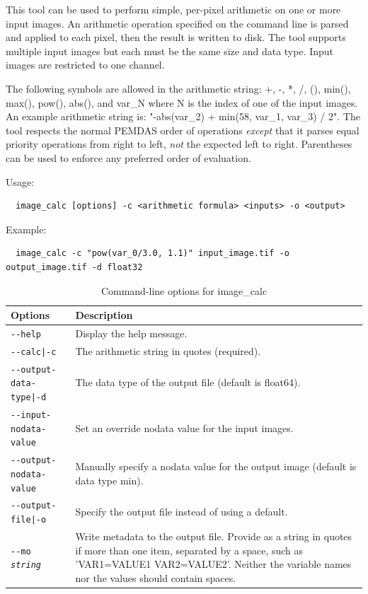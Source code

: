 This tool can be used to perform simple, per-pixel arithmetic on one or more
input images. An arithmetic operation specified on the command line is parsed
and applied to each pixel, then the result is written to disk. The tool
supports multiple input images but each must be the same size and data type.
Input images are restricted to one channel.

The following symbols are allowed in the arithmetic string: +, -, *, /,
(), min(), max(), pow(), abs(), and var\_N where N is the index of one
of the input images. An example arithmetic string is: "-abs(var\_2) +
min(58, var\_1, var\_3) / 2".  The tool respects the normal PEMDAS order
of operations \textit{except} that it parses equal priority operations
from right to left, \textit{not} the expected left to right.
Parentheses can be used to enforce any preferred order of evaluation.


\medskip

Usage:
\begin{verbatim}
  image_calc [options] -c <arithmetic formula> <inputs> -o <output>
\end{verbatim}

Example:
\begin{verbatim}
  image_calc -c "pow(var_0/3.0, 1.1)" input_image.tif -o output_image.tif -d float32
\end{verbatim}

\medskip

\begin{longtable}{|l|p{10cm}|}
\caption{Command-line options for image\_calc}
\label{tbl:imagecalc}
\endfirsthead
\endhead
\endfoot
\endlastfoot
\hline
Options & Description \\ \hline \hline
\texttt{-\/-help} & Display the help message.\\ \hline
\texttt{-\/-calc|-c} & The arithmetic string in quotes (required).\\ \hline
\texttt{-\/-output-data-type|-d} & The data type of the output file (default is float64).\\ \hline
\texttt{-\/-input-nodata-value} & Set an override nodata value for the input images.\\ \hline
\texttt{-\/-output-nodata-value} & Manually specify a nodata value for the output image (default is data type min).\\ \hline
\texttt{-\/-output-file|-o} & Specify the output file instead of using a default.\\ \hline
\texttt{-\/-mo \textit{string}} & Write metadata to the output file. Provide as a string in quotes if more than one item, separated by a space, such as 'VAR1=VALUE1 VAR2=VALUE2'. Neither the variable names nor the values should contain spaces. \\ \hline
\end{longtable}

